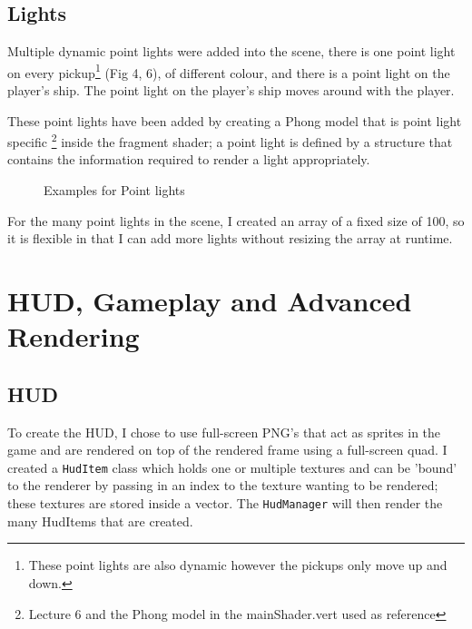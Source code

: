 \documentclass[11pt]{report}
\begin{document}
\subsection*{Lights}
Multiple dynamic point lights were added into the scene, there is one point light on every pickup\footnote{These point lights are also dynamic however the pickups only move up and down.} (Fig 4, 6), of different colour, and there is a point light on the player's ship. The point light on the player's ship moves around with the player.

These point lights have been added by creating a Phong model that is point light specific \footnote{Lecture 6 and the Phong model in the mainShader.vert used as reference} inside the fragment shader; a point light is defined by a structure that contains the information required to render a light appropriately.
\begin{figure}[H]
    \centering
    \caption{Examples for Point lights}
\end{figure}

For the many point lights in the scene, I created an array of a fixed size of 100, so it is flexible in that I can add more lights without resizing the array at runtime.

\newpage
\section*{HUD, Gameplay and Advanced Rendering}
\subsection*{HUD}
To create the HUD, I chose to use full-screen PNG's that act as sprites in the game and are rendered on top of the rendered frame using a full-screen quad. I created a \colorbox{mygrey}{\lstinline{HudItem}} class which holds one or multiple textures and can be 'bound' to the renderer by passing in an index to the texture wanting to be rendered; these textures are stored inside a vector. The \colorbox{mygrey}{\lstinline{HudManager}} will then render the many HudItems that are created.
\end{document}
